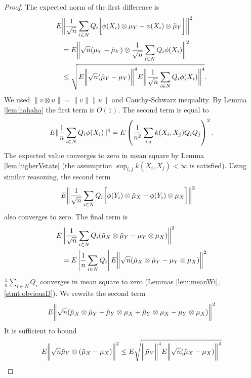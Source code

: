 \begin{proof}
The expected  norm of the first difference  is
\begin{align*}
  E &\bigg \|\frac {1} { \sqrt n}\sum_{i \in N} Q_i \bigg[   \phi(X_i)  \otimes   \mu_Y -\phi(X_i) \otimes \tilde \mu_Y \bigg] \bigg \|^2\\
  &=E \bigg \| \sqrt n(  \mu_Y-  \tilde  \mu_Y) \otimes \frac {1} { \sqrt n} \sum_{i \in N} Q_i  \phi(X_i)  \bigg \|^2  \\
 & \leq \sqrt {E \bigg \| \sqrt n( \tilde \mu_Y - \mu_Y ) \bigg \|^4 E \bigg \| \frac {1} { \sqrt n} \sum_{i \in N} Q_i  \phi(X_i)  \bigg \|^4}.
 \end{align*}
We used $\|v \otimes u\| = \|v \|\| u\|$ and Cauchy-Schwarz inequality.  By Lemma \ref{lem:hahaha} the first term is $O(1)$. The second term is equal to 
 \begin{align*}
 E  \|  \frac {1} { n} \sum_{i \in N} Q_i  \phi(X_i)    \|^4 = E  \left(\frac {1} { n^2}  \sum_{i,j} k(X_i,X_j)Q_iQ_j \right)^2.
 \end{align*}
The expected value converges  to zero in mean square by  Lemma \ref{lem:higherVstats} (the assumption $\sup_{i,j}  k(X_i,X_j) < \infty$ is satisfied). Using similar reasoning, the second term 
\begin{align*}
 E &\bigg \|\frac {1} { \sqrt n}\sum_{i \in N} Q_i \bigg[  \phi(Y_i) \otimes \tilde \mu_X  -\phi(Y_i)  \otimes   \mu_X \bigg] \bigg \|^2
\end{align*}
 also converges to zero. The final term is 
 \begin{align*} 
 E  &\bigg \|  \frac {1} { \sqrt n} \sum_{i \in N}Q_i  ( \tilde  \mu_X   \otimes \tilde \mu_Y - \mu_Y \otimes \mu_X)\bigg \|^2  \\
 &=E \left| \frac {1} {  n} \sum_{i \in N}Q_i \right | E \bigg \|  \sqrt n (\tilde  \mu_X   \otimes \tilde \mu_Y - \mu_Y \otimes \mu_X )\bigg \|^2 \\
\end{align*}
$ \frac {1} { n} \sum_{i \in N}Q_i$ converges in  mean square to zero (Lemmas \ref{lem:meanWi}, \ref{stmt:obviousD}). We rewrite the second term  
\begin{align*}
 E \bigg \| \sqrt n (\tilde  \mu_X   \otimes \tilde \mu_Y -  \tilde\mu_Y \otimes \mu_X + \tilde \mu_Y \otimes \mu_X - \mu_Y \otimes \mu_X) \bigg \|^2 
 \end{align*}
It is sufficient to bound  
 \begin{align*}
 \ev \bigg \|  \sqrt n \tilde \mu_Y \otimes ( \tilde \mu_X   -\mu_X) \bigg \|^2 & \leq  \ev  \sqrt {\bigg \|  \tilde \mu_Y \bigg \|^4 \ev \bigg \| \sqrt n ( \tilde \mu_X   -\mu_X) \bigg \|^4}\\

\end{align*}
\end{proof}
